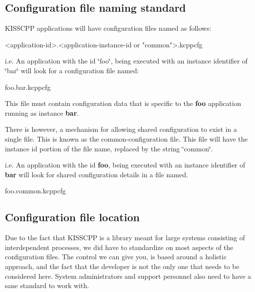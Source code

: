 \subsection*{Configuration file naming standard}

K\-I\-S\-S\-C\-P\-P applications will have configuration files named as follows\-:


\begin{DoxyCode}
<application-\textcolor{keywordtype}{id}>.<application-instance-\textcolor{keywordtype}{id} or \textcolor{stringliteral}{"common"}>.kcppcfg
\end{DoxyCode}


i.\-e. An application with the id \char`\"{}foo\char`\"{}, being executed with an instance identifier of \char`\"{}bar\char`\"{} will look for a configuration file named\-:


\begin{DoxyCode}
foo.bar.kcppcfg
\end{DoxyCode}


This file must contain configuration data that is specific to the {\bfseries foo} application running as instance {\bfseries bar}.

There is however, a mechanism for allowing shared configuration to exist in a single file. This is known as the common-\/configuration file. This file will have the instance id portion of the file name, replaced by the string \char`\"{}common\char`\"{}.

i.\-e. An application with the id {\bfseries foo}, being executed with an instance identifier of {\bfseries bar} will look for shared configuration details in a file named.


\begin{DoxyCode}
foo.common.kcppcfg
\end{DoxyCode}


\subsection*{Configuration file location}

Due to the fact that K\-I\-S\-S\-C\-P\-P is a library meant for large systems consisting of interdependent processes, we did have to standardize on most aspects of the configuration files. The control we can give you, is based around a holistic approach, and the fact that the developer is not the only one that needs to be considered here. System administrators and support personnel also need to have a sane standard to work with.

